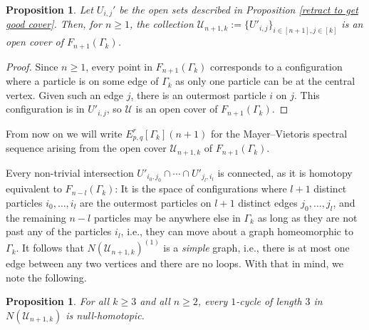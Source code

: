 \documentclass[pagebackref,colorlinks,citecolor=blue,linkcolor=blue,urlcolor=blue,filecolor=blue]{article}
\newtheorem{prop}[thm]{Proposition}
\theoremstyle{definition}\newtheorem{definition}[thm]{Definition}
\theoremstyle{definition}
\begin{document}
\begin{prop}\label{good cover}
Let $U_{i,j}'$ be the open sets described in Proposition \ref{retract to get good cover}.
Then, for $n\ge 1$, the collection $\mathcal{U}_{n+1, k}:=\{U'_{i,j}\}_{i\in [n+1], j\in [k]}$ is an open cover of $F_{n+1}(\Gamma_{k})$.
\end{prop}

\begin{proof}
Since $n\ge 1$, every point in $F_{n+1}(\Gamma_{k})$ corresponds to a configuration where a particle is on some edge of $\Gamma_{k}$ as only one particle can be at the central vertex.
Given such an edge $j$, there is an outermost particle $i$ on $j$.
This configuration is in $U'_{i,j}$, so $\mathcal{U}$ is an open cover of $F_{n+1}(\Gamma_{k})$.
\end{proof}

From now on we will write $E^{r}_{p,q}[\Gamma_{k}](n+1)$ for the Mayer--Vietoris spectral sequence arising from the open cover $\mathcal{U}_{n+1, k}$ of $F_{n+1}(\Gamma_{k})$.

Every non-trivial intersection $U'_{i_{0}, j_{0}}\cap\cdots \cap U'_{j_{l}, i_{l}}$ is connected, as it is homotopy equivalent to $F_{n-l}(\Gamma_{k})$: It is the space of configurations where $l+1$ distinct particles $i_{0}, \dots, i_{l}$ are the outermost particles on $l+1$ distinct edges $j_{0}, \dots, j_{l}$, and the remaining $n-l$ particles may be anywhere else in $\Gamma_{k}$ as long as they are not past any of the particles $i_{l}$, i.e., they can move about a graph homeomorphic to $\Gamma_{k}$.
It follows that $N(\mathcal{U}_{n+1, k})^{(1)}$ is a \emph{simple} graph, i.e., there is at most one edge between any two vertices and there are no loops.
With that in mind, we note the following.

\begin{prop}\label{3 cycles are contractible}
For all $k\ge 3$ and all $n\ge 2$, every $1$-cycle of length $3$ in $N(\mathcal{U}_{n+1, k})$ is null-homotopic.
\end{prop}
\end{document}
